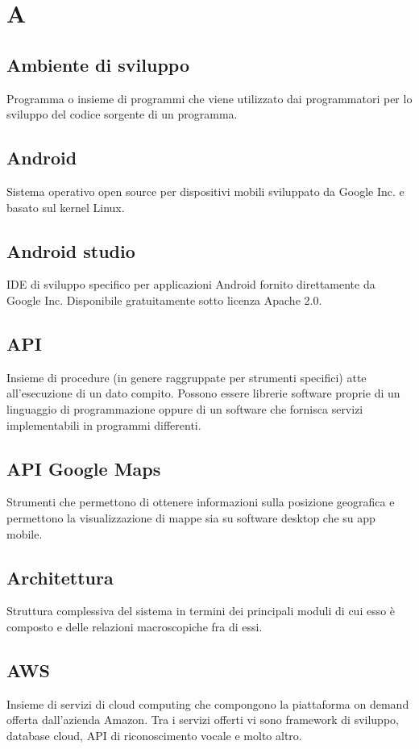 \section{A}
\subsection*{Ambiente di sviluppo} Programma o insieme di programmi che viene utilizzato dai programmatori per lo sviluppo del codice sorgente di un programma.
\subsection*{Android} Sistema operativo open source per dispositivi mobili sviluppato da Google Inc. e basato sul kernel Linux.
\subsection*{Android studio} IDE di sviluppo specifico per applicazioni Android fornito direttamente da Google Inc. Disponibile gratuitamente sotto licenza Apache 2.0.
\subsection*{API} Insieme di procedure (in genere raggruppate per strumenti specifici) atte all'esecuzione di un dato compito. Possono essere librerie software proprie di un linguaggio di programmazione oppure di un software che fornisca servizi implementabili in programmi differenti.
\subsection*{API Google Maps} Strumenti che permettono di ottenere informazioni sulla posizione geografica e permettono la visualizzazione di mappe sia su software desktop che su app mobile.
\subsection*{Architettura} Struttura complessiva del sistema in termini dei principali moduli di cui esso è composto e delle relazioni macroscopiche fra di essi.
\subsection*{AWS} Insieme di servizi di cloud computing che compongono la piattaforma on demand offerta dall'azienda Amazon. Tra i servizi offerti vi sono framework di sviluppo, database cloud, API di riconoscimento vocale e molto altro.
\newpage
